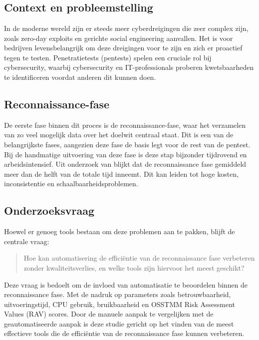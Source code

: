 
\chapter{}%
\label{ch:inleiding}

\section{Context en probleemstelling}
In de moderne wereld zijn er steeds meer cyberdreigingen die zeer complex zijn, zoals zero-day exploits en gerichte social engineering aanvallen. 
Het is voor bedrijven levensbelangrijk om deze dreigingen voor te zijn en zich er proactief tegen te testen. 
Penetratietests (pentests) spelen een cruciale rol bij cybersecurity, waarbij cybersecurity en IT-professionals proberen kwetsbaarheden te identificeren voordat anderen dit kunnen doen.

\section{Reconnaissance-fase}
De eerste fase binnen dit proces is de reconnaissance-fase, waar het verzamelen van zo veel mogelijk data over het doelwit centraal staat. 
Dit is een van de belangrijkste fases, aangezien deze fase de basis legt voor de rest van de pentest. 
Bij de handmatige uitvoering van deze fase is deze stap bijzonder tijdrovend en arbeidsintensief. 
Uit onderzoek van \textcite{DBLP} blijkt dat de reconnaissance fase gemiddeld meer dan de helft van de totale tijd inneemt. 
Dit kan leiden tot hoge kosten, inconsistentie en schaalbaarheidsproblemen.

\section{Onderzoeksvraag}
Hoewel er genoeg tools bestaan om deze problemen aan te pakken, blijft de centrale vraag:
\begin{quote}
    Hoe kan automatisering de efficiëntie van de reconnaissance fase verbeteren zonder kwaliteitsverlies, en welke tools zijn hiervoor het meest geschikt?
\end{quote}

Deze vraag is bedoelt om de invloed van automatisatie te beoordelen binnen de reconnaissance fase.
Met de nadruk op parameters zoals betrouwbaarheid, uitvoeringstijd, CPU gebruik, bruikbaarheid en OSSTMM Risk Assessment Values (RAV) scores.
Door de manuele aanpak te vergelijken met de geautomatiseerde aanpak is deze studie gericht op het vinden van de meest effectieve tools die de efficiëntie van de reconnaissance fase kunnen verbeteren.

